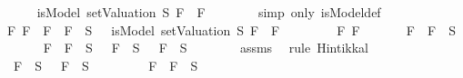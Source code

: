 \begin{isabellebody}
\ \ \ \ \isamarkupfalse%
\ {\isachardoublequoteopen}isModel\ {\isacharparenleft}setValuation\ S{\isacharparenright}\ {\isacharparenleft}F{}\ \isactrlbold {\isasymand}\ F{}{\isacharparenright}{\isachardoublequoteclose}\isanewline
\ \ \ \ \ \ \isamarkupfalse%
\ {\isacharparenleft}simp\ only{\isacharcolon}\ isModel{\isacharunderscore}def{\isacharparenright}\ \isanewline
\ \ \isamarkupfalse%
\isanewline
{}\isamarkupfalse%
\isanewline
\ \ \isamarkupfalse%
\ {\isachardoublequoteopen}{\isasymAnd}F{}\ F{}{\isachardot}\ \isactrlbold {\isasymnot}\ {\isacharparenleft}F{}\ \isactrlbold {\isasymand}\ F{}{\isacharparenright}\ {\isasymin}\ S\ {\isasymlongrightarrow}\ {\isasymnot}\ isModel\ {\isacharparenleft}setValuation\ S{\isacharparenright}\ {\isacharparenleft}F{}\ \isactrlbold {\isasymand}\ F{}{\isacharparenright}{\isachardoublequoteclose}\isanewline
\ \ \isamarkupfalse%
\isanewline
\ \ \ \ \isamarkupfalse%
\ F{}\ F{}\isanewline
\ \ \ \ \isamarkupfalse%
\ {\isachardoublequoteopen}\isactrlbold {\isasymnot}\ {\isacharparenleft}F{}\ \isactrlbold {\isasymand}\ F{}{\isacharparenright}\ {\isasymin}\ S{\isachardoublequoteclose}\isanewline
\ \ \ \ \isamarkupfalse%
\ {\isachardoublequoteopen}\isactrlbold {\isasymnot}\ {\isacharparenleft}F{}\ \isactrlbold {\isasymand}\ F{}{\isacharparenright}\ {\isasymin}\ S\ {\isasymlongrightarrow}\ \isactrlbold {\isasymnot}\ F{}\ {\isasymin}\ S\ {\isasymor}\ \isactrlbold {\isasymnot}\ F{}\ {\isasymin}\ S{\isachardoublequoteclose}\isanewline
\ \ \ \ \ \ \isamarkupfalse%
\ assms{\isacharparenleft}{}{\isacharparenright}\ \isamarkupfalse%
\ {\isacharparenleft}rule\ Hintikka{\isacharunderscore}l{}{\isacharparenright}\isanewline
\ \ \ \ \isamarkupfalse%
\ \isamarkupfalse%
\ {\isachardoublequoteopen}\isactrlbold {\isasymnot}\ F{}\ {\isasymin}\ S\ {\isasymor}\ \isactrlbold {\isasymnot}\ F{}\ {\isasymin}\ S{\isachardoublequoteclose}\isanewline
\ \ \ \ \ \ \isamarkupfalse%
\ {\isacartoucheopen}\isactrlbold {\isasymnot}\ {\isacharparenleft}F{}\ \isactrlbold {\isasymand}\ F{}{\isacharparenright}\ {\isasymin}\ S{\isacartoucheclose}\ \isamarkupfalse%

\end{isabellebody}
